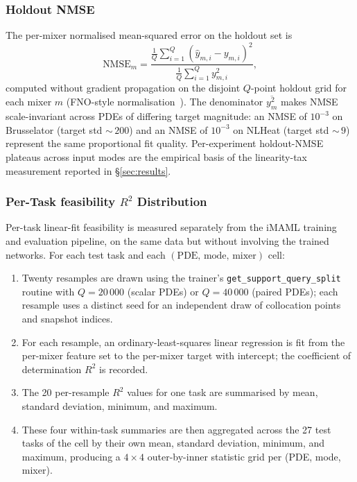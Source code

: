 \documentclass[10pt,journal,compsoc]{IEEEtran}
\begin{document}
\subsubsection{Holdout NMSE}\label{subsubsec:holdout_nmse}

The per-mixer normalised mean-squared error on the holdout set is
\begin{equation}\label{eq:nmse}
\text{NMSE}_m =
\frac{\frac{1}{Q}\sum_{i=1}^{Q} (\hat{y}_{m,i} - y_{m,i})^2}
     {\frac{1}{Q}\sum_{i=1}^{Q} y_{m,i}^2},
\end{equation}
computed without gradient propagation on the disjoint $Q$-point
holdout grid for each mixer $m$ (FNO-style
normalisation~\cite{li2021fno}). The denominator
$\overline{y_m^2}$ makes NMSE scale-invariant across PDEs of differing
target magnitude: an NMSE of $10^{-3}$ on Brusselator (target std
${\sim}\,200$) and an NMSE of $10^{-3}$ on NLHeat (target std
${\sim}\,9$) represent the same proportional fit quality. Per-experiment
holdout-NMSE plateaus across input modes are the empirical basis of the
linearity-tax measurement reported in \S\ref{sec:results}.

\subsubsection{Per-Task feasibility $R^2$ Distribution}\label{subsubsec:r2_methodology}

Per-task linear-fit feasibility is measured separately from the iMAML
training and evaluation pipeline, on the same data but without
involving the trained networks. For each test task and each
$(\text{PDE},\, \text{mode},\, \text{mixer})$ cell:

\begin{enumerate}
\item Twenty resamples are drawn using the trainer's
      \texttt{get\_support\_query\_split} routine with $Q = 20\,000$
      (scalar PDEs) or $Q = 40\,000$ (paired PDEs); each resample uses
      a distinct seed for an independent draw of collocation points and
      snapshot indices.
\item For each resample, an ordinary-least-squares linear regression is
      fit from the per-mixer feature set to the per-mixer target with
      intercept; the coefficient of determination $R^2$ is recorded.
\item The 20 per-resample $R^2$ values for one task are summarised by
      mean, standard deviation, minimum, and maximum.
\item These four within-task summaries are then aggregated across the
      27 test tasks of the cell by their own mean, standard deviation,
      minimum, and maximum, producing a $4 \times 4$ outer-by-inner
      statistic grid per (PDE, mode, mixer).
\end{enumerate}
\end{document}
